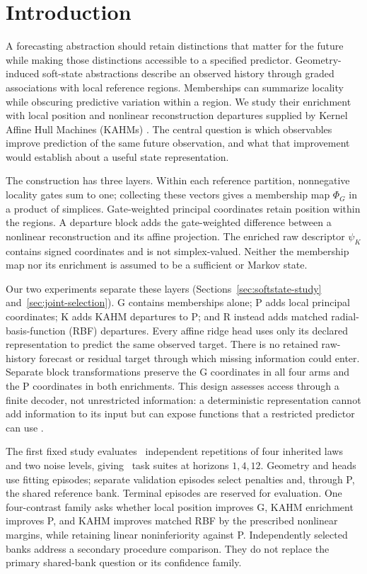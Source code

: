 \section{Introduction}\label{sec:introduction}

A forecasting abstraction should retain distinctions that matter for the
future while making those distinctions accessible to a specified
predictor. Geometry-induced soft-state abstractions describe an observed
history through graded associations with local reference regions.
Memberships can summarize locality while obscuring predictive variation
within a region. We study their enrichment with local position and
nonlinear reconstruction departures supplied by Kernel Affine Hull
Machines (KAHMs) \citep{Kumar2024KAHM}. The central question is which
observables improve prediction of the same future observation, and what
that improvement would establish about a useful state representation.

The construction has three layers. Within each reference partition,
nonnegative locality gates sum to one; collecting these vectors gives
a membership map $\Phi_G$ in a product of simplices. Gate-weighted
principal coordinates retain position within the regions. A departure
block adds the gate-weighted difference between a nonlinear
reconstruction and its affine projection. The enriched raw descriptor
$\psi_K$ contains signed coordinates and is not simplex-valued.
Neither the membership map nor its enrichment is assumed to be a
sufficient or Markov state.

Our two experiments separate these layers
(Sections~\ref{sec:softstate-study} and~\ref{sec:joint-selection}).
G contains memberships alone;
P adds local principal coordinates; K adds KAHM departures to P;
and R instead adds matched radial-basis-function (RBF) departures.
Every affine ridge head uses only its declared representation to
predict the same observed target. There is no retained raw-history
forecast or residual target through which missing information could
enter. Separate block transformations preserve the G coordinates in
all four arms and the P coordinates in both enrichments. This design
assesses access through a finite decoder, not unrestricted information:
a deterministic representation cannot add information to its input
but can expose functions that a restricted predictor can use
\citep{Fukumizu2004SDR,Xu2020Usable}.

The first fixed study evaluates \SARepetitions\ independent repetitions of
four inherited laws and two noise levels, giving \SATasks\ task suites
at horizons $1,4,12$. Geometry and heads use fitting episodes; separate
validation episodes select penalties and, through P, the shared
reference bank. Terminal episodes are reserved for evaluation.
One four-contrast family asks whether local position improves G,
KAHM enrichment improves P, and KAHM improves matched RBF by the
prescribed nonlinear margins, while retaining linear noninferiority
against P. Independently selected banks address a secondary procedure
comparison. They do not replace the primary shared-bank question or
its confidence family.

